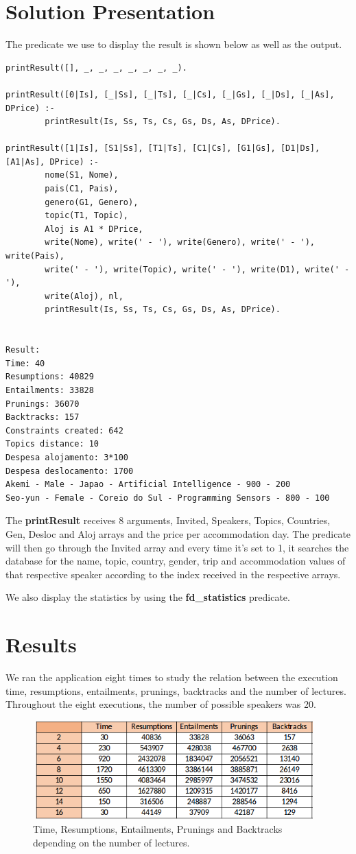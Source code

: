 \documentclass[runningheads,a4paper]{llncs}
\begin{document}
\section{Solution Presentation}
The predicate we use to display the result is shown below as well as the output.

\begin{verbatim}
printResult([], _, _, _, _, _, _, _).

printResult([0|Is], [_|Ss], [_|Ts], [_|Cs], [_|Gs], [_|Ds], [_|As], DPrice) :-
        printResult(Is, Ss, Ts, Cs, Gs, Ds, As, DPrice).

printResult([1|Is], [S1|Ss], [T1|Ts], [C1|Cs], [G1|Gs], [D1|Ds], [A1|As], DPrice) :-
        nome(S1, Nome),
        pais(C1, Pais),
        genero(G1, Genero),
        topic(T1, Topic),
        Aloj is A1 * DPrice,
        write(Nome), write(' - '), write(Genero), write(' - '), write(Pais),
        write(' - '), write(Topic), write(' - '), write(D1), write(' - '), 
        write(Aloj), nl,
        printResult(Is, Ss, Ts, Cs, Gs, Ds, As, DPrice).


Result:
Time: 40
Resumptions: 40829
Entailments: 33828
Prunings: 36070
Backtracks: 157
Constraints created: 642
Topics distance: 10
Despesa alojamento: 3*100
Despesa deslocamento: 1700
Akemi - Male - Japao - Artificial Intelligence - 900 - 200
Seo-yun - Female - Coreio do Sul - Programming Sensors - 800 - 100
\end{verbatim}

The \textbf{printResult} receives 8 arguments, Invited, Speakers, Topics, Countries, Gen, Desloc and Aloj arrays and the price per accommodation day. The predicate will then go through the Invited array and every time it's set to 1, it searches the database for the name, topic, country, gender, trip and accommodation values of that respective speaker according to the index received in the respective arrays.

We also display the statistics by using the \textbf{fd\_statistics} predicate.

\section{Results}
We ran the application eight times to study the relation between the execution time, resumptions, entailments, prunings, backtracks and the number of lectures. Throughout the eight executions, the number of possible speakers was 20. 

\begin{figure}[!ht]
\centering
\includegraphics[width=10.9cm,height=3.8cm]{Table1}
\caption{Time, Resumptions, Entailments, Prunings and Backtracks depending on the number of lectures.}
\label{fig:Table1}
\end{figure}
\end{document}
